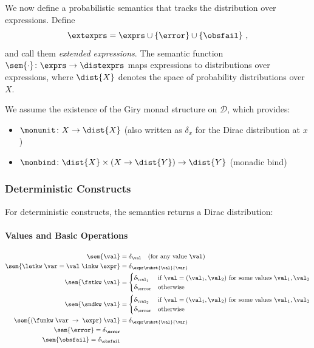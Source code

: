 We now define a probabilistic semantics that tracks the distribution over expressions. Define
%
\[
	\extexprs = \exprs \cup  \{ \error \} \cup \{ \obsfail \}~,
\]
%
and call them \emph{extended expressions}.
%
The semantic function $\sem{\cdot} \colon \exprs \rightarrow \distexprs$ maps expressions to distributions over expressions, where $\dist{X}$ denotes the space of probability distributions over $X$.

We assume the existence of the Giry monad structure on $\mathcal{D}$, which provides:
\begin{itemize}
    \item $\monunit \colon X \rightarrow \dist{X}$ (also written as $\delta_x$ for the Dirac distribution at $x$)
    \item $\monbind \colon \dist{X} \times (X \to \dist{Y}) \rightarrow \dist{Y}$ (monadic bind)
\end{itemize}

\subsubsection{Deterministic Constructs}

For deterministic constructs, the semantics returns a Dirac distribution:

\paragraph{Values and Basic Operations}
\begin{align*}
\sem{\val} &= \delta_\val \quad \text{(for any value } \val \text{)} \\
\sem{\letkw \; \var = \val \; \inkw \; \expr} &= \delta_{\expr\subst{\val}{\var}} \\
%
%
\sem{ \fstkw \; \val} & = 
\begin{cases}
	\delta_{\val_1}  & \text{if $\val = (\val_1,\val_2)$ for some values $\val_1,\val_2$} \\
	\delta_{\error}  & \text{otherwise}
\end{cases}
%
\\
%
%
\sem{ \sndkw \; \val} & = 
\begin{cases}
	\delta_{\val_2}  & \text{if $\val = (\val_1,\val_2)$ for some values $\val_1,\val_2$} \\
	\delta_{\error}  & \text{otherwise}
\end{cases}
%
\\
%
\sem{ (\funkw \; \var \; \rightarrow \; \expr) \; \val } &= \delta_{\expr\subst{\val}{\var}}\\
\sem{\error} = \delta_\error \\
\sem{\obsfail} = \delta_\obsfail
\end{align*}
%

